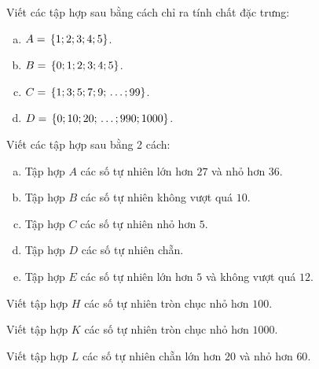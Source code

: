 \begin{bt}
Viết các tập hợp sau bằng cách chỉ ra tính chất đặc trưng:
\begin{enumerate}[a)]
\item $A = {\rm{ }}\left\{ {1;{\rm{ }}2;{\rm{ }}3;{\rm{ }}4;{\rm{ }}5} \right\}$.
\item $B = {\rm{ }}\left\{ {0;{\rm{ }}1;{\rm{ }}2;{\rm{ }}3;{\rm{ }}4;{\rm{ }}5} \right\}$.
\item $C = {\rm{ }}\left\{ {1;{\rm{ }}3;{\rm{ }}5;{\rm{ }}7;{\rm{ }}9;{\rm{ }} \ldots ;{\rm{ }}99} \right\}$.
\item $D = {\rm{ }}\left\{ {0;{\rm{ }}10;{\rm{ }}20;{\rm{ }} \ldots {\rm{ }};{\rm{ }}990;{\rm{ }}1000} \right\}$.
\end{enumerate}
\end{bt} 
\begin{bt}
Viết các tập hợp sau bằng 2 cách:
\begin{enumerate}[a)]
\item Tập hợp $A$ các số tự nhiên lớn hơn $27$ và nhỏ hơn $36$.
\item Tập hợp $B$ các số tự nhiên không vượt quá $10$.
\item Tập hợp $C$ các số tự nhiên nhỏ hơn $5$.
\item Tập hợp $D$ các số tự nhiên chẵn.
\item Tập hợp $E$ các số tự nhiên lớn hơn $5$ và không vượt quá $12$.
\end{enumerate}
\end{bt} 
\begin{bt}
Viết tập hợp $H$ các số tự nhiên tròn chục nhỏ hơn $100$.
\end{bt} 
\begin{bt}
Viết tập hợp $K$ các số tự nhiên tròn chục nhỏ hơn $1000$.
\end{bt} 
\begin{bt}
Viết tập hợp $L$ các số tự nhiên chẵn lớn hơn $20$ và nhỏ hơn $60$.
\end{bt}
